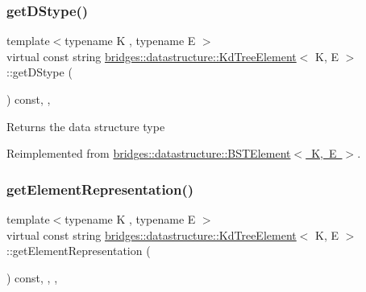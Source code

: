 \subsubsection{\texorpdfstring{get\+D\+Stype()}{getDStype()}}
{\footnotesize\ttfamily template$<$typename K , typename E $>$ \\
virtual const string \mbox{\hyperlink{classbridges_1_1datastructure_1_1_kd_tree_element}{bridges\+::datastructure\+::\+Kd\+Tree\+Element}}$<$ K, E $>$\+::get\+D\+Stype (\begin{DoxyParamCaption}{ }\end{DoxyParamCaption}) const\hspace{0.3cm}{\ttfamily [inline]}, {\ttfamily [override]}, {\ttfamily [virtual]}}

\begin{DoxyReturn}{Returns}
the data structure type 
\end{DoxyReturn}


Reimplemented from \mbox{\hyperlink{classbridges_1_1datastructure_1_1_b_s_t_element_a2bb8cc9ec4b6bc5b89ecef0f17be366f}{bridges\+::datastructure\+::\+B\+S\+T\+Element$<$ K, E $>$}}.

\mbox{\label{classbridges_1_1datastructure_1_1_kd_tree_element_a5413ecaf152e3df5fb45dd85da812888}} 
\subsubsection{\texorpdfstring{get\+Element\+Representation()}{getElementRepresentation()}}
{\footnotesize\ttfamily template$<$typename K , typename E $>$ \\
virtual const string \mbox{\hyperlink{classbridges_1_1datastructure_1_1_kd_tree_element}{bridges\+::datastructure\+::\+Kd\+Tree\+Element}}$<$ K, E $>$\+::get\+Element\+Representation (\begin{DoxyParamCaption}{ }\end{DoxyParamCaption}) const\hspace{0.3cm}{\ttfamily [inline]}, {\ttfamily [override]}, {\ttfamily [protected]}, {\ttfamily [virtual]}}

